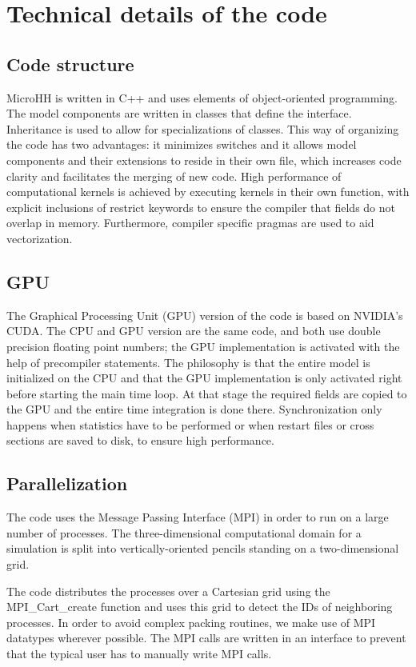 \documentclass[gmd]{copernicus}
\begin{document}
\section{Technical details of the code}\label{sec:technical}
\subsection{Code structure}
MicroHH is written in C++ and uses elements of object-oriented programming. The model components are written in classes that define the interface. Inheritance is used to allow for specializations of classes. This way of organizing the code has two advantages: it minimizes switches and it allows model components and their extensions to reside in their own file, which increases code clarity and facilitates the merging of new code. High performance of computational kernels is achieved by executing kernels in their own function, with explicit inclusions of restrict keywords to ensure the compiler that fields do not overlap in memory. Furthermore, compiler specific pragmas are used to aid vectorization.

\subsection{GPU}
The Graphical Processing Unit (GPU) version of the code is based on NVIDIA's CUDA. The CPU and GPU version are the same code, and both use double precision floating point numbers; the GPU implementation is activated with the help of precompiler statements. The philosophy is that the entire model is initialized on the CPU and that the GPU implementation is only activated right before starting the main time loop. At that stage the required fields are copied to the GPU and the entire time integration is done there. Synchronization only happens when statistics have to be performed or when restart files or cross sections are saved to disk, to ensure high performance.

\subsection{Parallelization}
The code uses the Message Passing Interface (MPI) in order to run on a large number of processes. The three-dimensional computational domain for a simulation is split into vertically-oriented pencils standing on a two-dimensional grid.

The code distributes the processes over a Cartesian grid using the MPI\_Cart\_create function and uses this grid to detect the IDs of neighboring processes. In order to avoid complex packing routines, we make use of MPI datatypes wherever possible. The MPI calls are written in an interface to prevent that the typical user has to manually write MPI calls.
\end{document}
